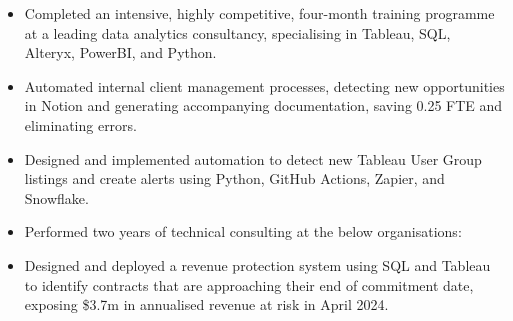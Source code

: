 \documentclass[10pt,a4paper,ragged2e,withhyper]{altacv}
\begin{document}


\makecvname



\begin{paracol}{2}

\begin{itemize}
\item Completed an intensive, highly competitive, four-month training programme at a leading data analytics consultancy, specialising in Tableau, SQL, Alteryx, PowerBI, and Python.
\item Automated internal client management processes, detecting new opportunities in Notion and generating accompanying documentation, saving 0.25 FTE and eliminating errors.
\item Designed and implemented automation to detect new Tableau User Group listings and create alerts using Python, GitHub Actions, Zapier, and Snowflake.
\item Performed two years of technical consulting at the below organisations:

\medskip
{}

\end{itemize}

\divider

\begin{itemize}
\item Designed and deployed a revenue protection system using SQL and Tableau to identify contracts that are approaching their end of commitment date, exposing \$3.7m in annualised revenue at risk in April 2024.


\end{itemize}
\end{paracol}
\end{document}
